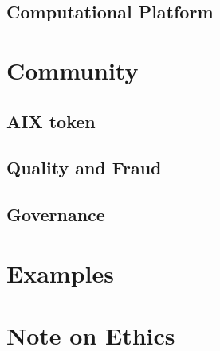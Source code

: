 \documentclass{article}
\begin{document}
\subsection{Computational Platform}

\section{Community}

\subsection{AIX token}

\subsection{Quality and Fraud}

\subsection{Governance}

\section{Examples}

\section{Note on Ethics}
\end{document}
